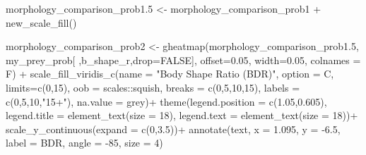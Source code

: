 \documentclass[
]{article}
\newenvironment{Shaded}{\begin{snugshade}}{\end{snugshade}}
\newcommand{\AttributeTok}[1]{\textcolor[rgb]{0.77,0.63,0.00}{#1}}
\newcommand{\ConstantTok}[1]{\textcolor[rgb]{0.00,0.00,0.00}{#1}}
\newcommand{\DecValTok}[1]{\textcolor[rgb]{0.00,0.00,0.81}{#1}}
\newcommand{\FloatTok}[1]{\textcolor[rgb]{0.00,0.00,0.81}{#1}}
\newcommand{\FunctionTok}[1]{\textcolor[rgb]{0.00,0.00,0.00}{#1}}
\newcommand{\NormalTok}[1]{#1}
\newcommand{\OtherTok}[1]{\textcolor[rgb]{0.56,0.35,0.01}{#1}}
\newcommand{\SpecialCharTok}[1]{\textcolor[rgb]{0.00,0.00,0.00}{#1}}
\newcommand{\StringTok}[1]{\textcolor[rgb]{0.31,0.60,0.02}{#1}}
\begin{document}
\begin{Shaded}
\begin{Highlighting}[]
\NormalTok{morphology\_comparison\_prob1}\FloatTok{.5} \OtherTok{\textless{}{-}}\NormalTok{ morphology\_comparison\_prob1 }\SpecialCharTok{+} \FunctionTok{new\_scale\_fill}\NormalTok{()}

\NormalTok{morphology\_comparison\_prob2 }\OtherTok{\textless{}{-}} \FunctionTok{gheatmap}\NormalTok{(morphology\_comparison\_prob1}\FloatTok{.5}\NormalTok{, }
\NormalTok{                                        my\_prey\_prob[ ,}\StringTok{\textquotesingle{}b\_shape\_r\textquotesingle{}}\NormalTok{,}\AttributeTok{drop=}\ConstantTok{FALSE}\NormalTok{], }
                                        \AttributeTok{offset=}\FloatTok{0.05}\NormalTok{, }\AttributeTok{width=}\FloatTok{0.05}\NormalTok{, }\AttributeTok{colnames =}\NormalTok{ F) }\SpecialCharTok{+}
  \FunctionTok{scale\_fill\_viridis\_c}\NormalTok{(}\AttributeTok{name =} \StringTok{"Body Shape Ratio (BDR)"}\NormalTok{, }
                       \AttributeTok{option =} \StringTok{\textquotesingle{}C\textquotesingle{}}\NormalTok{, }\AttributeTok{limits=}\FunctionTok{c}\NormalTok{(}\DecValTok{0}\NormalTok{,}\DecValTok{15}\NormalTok{), }
                       \AttributeTok{oob =}\NormalTok{ scales}\SpecialCharTok{::}\NormalTok{squish, }
                       \AttributeTok{breaks =} \FunctionTok{c}\NormalTok{(}\DecValTok{0}\NormalTok{,}\DecValTok{5}\NormalTok{,}\DecValTok{10}\NormalTok{,}\DecValTok{15}\NormalTok{), }
                       \AttributeTok{labels =} \FunctionTok{c}\NormalTok{(}\DecValTok{0}\NormalTok{,}\DecValTok{5}\NormalTok{,}\DecValTok{10}\NormalTok{,}\StringTok{"15+"}\NormalTok{), }
                       \AttributeTok{na.value =} \StringTok{\textquotesingle{}grey\textquotesingle{}}\NormalTok{)}\SpecialCharTok{+}
  \FunctionTok{theme}\NormalTok{(}\AttributeTok{legend.position =} \FunctionTok{c}\NormalTok{(}\FloatTok{1.05}\NormalTok{,}\FloatTok{0.605}\NormalTok{),}
        \AttributeTok{legend.title =} \FunctionTok{element\_text}\NormalTok{(}\AttributeTok{size =} \DecValTok{18}\NormalTok{), }
        \AttributeTok{legend.text =} \FunctionTok{element\_text}\NormalTok{(}\AttributeTok{size =} \DecValTok{18}\NormalTok{))}\SpecialCharTok{+}
  \FunctionTok{scale\_y\_continuous}\NormalTok{(}\AttributeTok{expand =} \FunctionTok{c}\NormalTok{(}\DecValTok{0}\NormalTok{,}\FloatTok{3.5}\NormalTok{))}\SpecialCharTok{+}
  \FunctionTok{annotate}\NormalTok{(}\StringTok{\textquotesingle{}text\textquotesingle{}}\NormalTok{, }\AttributeTok{x =} \FloatTok{1.095}\NormalTok{, }\AttributeTok{y =} \SpecialCharTok{{-}}\FloatTok{6.5}\NormalTok{, }\AttributeTok{label =} \StringTok{\textquotesingle{}BDR\textquotesingle{}}\NormalTok{, }\AttributeTok{angle =} \SpecialCharTok{{-}}\DecValTok{85}\NormalTok{, }\AttributeTok{size =} \DecValTok{4}\NormalTok{)}


\end{Highlighting}
\end{Shaded}
\end{document}
